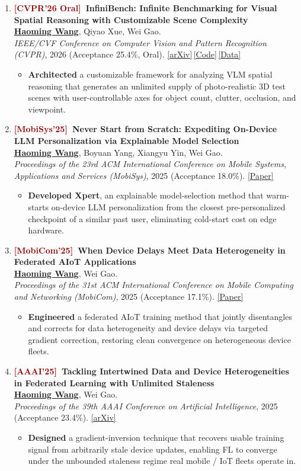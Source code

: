\documentclass[11pt, letterpaper]{article}
\newenvironment{publist}{
  \begin{enumerate}[leftmargin=1.7em, itemsep=4pt, parsep=0pt, topsep=2pt,
                    label=\arabic*., ref=\arabic*, series=pubs]
}{\end{enumerate}}
\newcommand{\impactbullet}[1]{%
  \par\vspace{1pt}%
  \begin{itemize}[leftmargin=1.2em, topsep=0pt, itemsep=0pt, parsep=0pt, partopsep=0pt]
    \item #1
  \end{itemize}}
\newcommand{\me}{\underline{\textbf{Haoming Wang}}}
\begin{document}
\begin{publist}
\item\label{pub:infinibench} \textbf{\textcolor{darkred}{[CVPR'26 Oral]}\ InfiniBench: Infinite Benchmarking for Visual Spatial Reasoning with Customizable Scene Complexity}\\
\me, Qiyao Xue, Wei Gao.\\
\textit{IEEE/CVF Conference on Computer Vision and Pattern Recognition (CVPR)}, 2026 (Acceptance 25.4\%, Oral). \href{https://arxiv.org/abs/2511.18200}{[arXiv]}\,\href{https://github.com/pittisl/infinibench}{[Code]}\,\href{https://huggingface.co/datasets/Haoming645/infinibench}{[Data]}
\impactbullet{\textbf{Architected} a customizable framework for analyzing VLM spatial reasoning that generates an unlimited supply of photo-realistic 3D test scenes with user-controllable axes for object count, clutter, occlusion, and viewpoint.}

\item\label{pub:xpert} \textbf{\textcolor{darkred}{[MobiSys'25]}\ Never Start from Scratch: Expediting On-Device LLM Personalization via Explainable Model Selection}\\
\me, Boyuan Yang, Xiangyu Yin, Wei Gao.\\
\textit{Proceedings of the 23rd ACM International Conference on Mobile Systems, Applications and Services (MobiSys)}, 2025 (Acceptance 18.0\%). \href{https://haomingwang645.github.io/pdfs/xpert_paper.pdf}{[Paper]}
\impactbullet{\textbf{Developed Xpert}, an explainable model-selection method that warm-starts on-device LLM personalization from the closest pre-personalized checkpoint of a similar past user, eliminating cold-start cost on edge hardware.}

\item\label{pub:feddc} \textbf{\textcolor{darkred}{[MobiCom'25]}\ When Device Delays Meet Data Heterogeneity in Federated AIoT Applications}\\
\me, Wei Gao.\\
\textit{Proceedings of the 31st ACM International Conference on Mobile Computing and Networking (MobiCom)}, 2025 (Acceptance 17.1\%). \href{https://haomingwang645.github.io/pdfs/feddc_paper.pdf}{[Paper]}
\impactbullet{\textbf{Engineered} a federated AIoT training method that jointly disentangles and corrects for data heterogeneity and device delays via targeted gradient correction, restoring clean convergence on heterogeneous device fleets.}

\item\label{pub:aaai} \textbf{\textcolor{darkred}{[AAAI'25]}\ Tackling Intertwined Data and Device Heterogeneities in Federated Learning with Unlimited Staleness}\\
\me, Wei Gao.\\
\textit{Proceedings of the 39th AAAI Conference on Artificial Intelligence}, 2025 (Acceptance 23.4\%). \href{https://arxiv.org/abs/2309.13536}{[arXiv]}
\impactbullet{\textbf{Designed} a gradient-inversion technique that recovers usable training signal from arbitrarily stale device updates, enabling FL to converge under the unbounded staleness regime real mobile / IoT fleets operate in.}
\end{publist}
\end{document}
